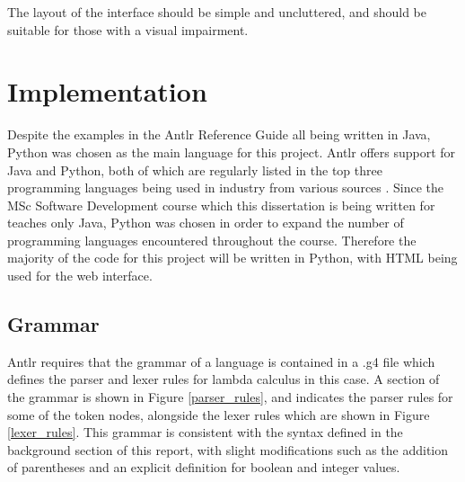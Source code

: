 \documentclass[a4paper,12pt]{report}
\begin{document}
The layout of the interface should be simple and uncluttered, and should be suitable for those with a visual impairment.

\section{Implementation}

Despite the examples in the Antlr Reference Guide \cite{Parr2012} all being written in Java, Python was chosen as the main language for this project. Antlr offers support for Java and Python, both of which are regularly listed in the top three programming languages being used in industry from various sources \cite{ProgLang1}\cite{ProgLang2}\cite{ProgLang3}. Since the MSc Software Development course which this dissertation is being written for teaches only Java, Python was chosen in order to expand the number of programming languages encountered throughout the course. Therefore the majority of the code for this project will be written in Python, with HTML being used for the web interface.

\subsection{Grammar}

Antlr requires that the grammar of a language is contained in a .g4 file which defines the parser and lexer rules for lambda calculus in this case. A section of the grammar is shown in Figure \ref{parser_rules}, and indicates the parser rules for some of the token nodes, alongside the lexer rules which are shown in Figure \ref{lexer_rules}. This grammar is consistent with the syntax defined in the background section of this report, with slight modifications such as the addition of parentheses and an explicit definition for boolean and integer values.
\end{document}
